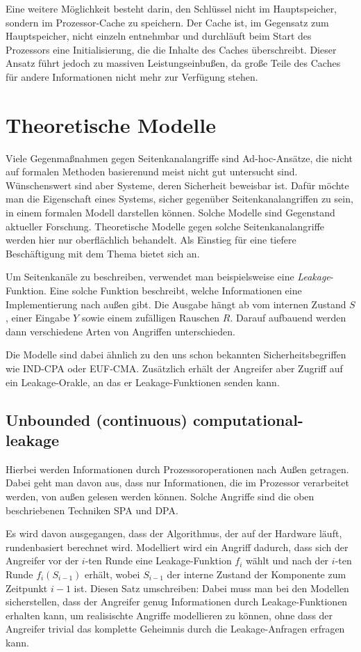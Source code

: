 Eine weitere Möglichkeit besteht darin, den Schlüssel nicht im
Hauptspeicher, sondern im Prozessor-Cache zu speichern. Der Cache ist,
im Gegensatz zum Hauptspeicher, nicht einzeln entnehmbar und durchläuft
beim Start des Prozessors eine Initialisierung, die die Inhalte des
Caches überschreibt. Dieser Ansatz führt jedoch zu massiven
Leistungseinbußen, da große Teile des Caches für andere Informationen
nicht mehr zur Verfügung stehen.
\section{Theoretische Modelle}
Viele Gegenmaßnahmen gegen Seitenkanalangriffe sind \glqq
Ad-hoc\grqq-Ansätze, die nicht auf formalen Methoden
basierenund meist nicht gut untersucht sind. Wünschenswert sind aber Systeme, deren Sicherheit beweisbar
ist. Dafür möchte man die Eigenschaft eines Systems, sicher gegenüber
Seitenkanalangriffen zu sein, in einem formalen Modell darstellen
können. Solche Modelle sind Gegenstand aktueller Forschung. Theoretische
Modelle gegen solche Seitenkanalangriffe werden hier nur oberflächlich
behandelt. Als Einstieg für eine tiefere Beschäftigung mit dem Thema
bietet sich \cite{mol2010} an.

Um Seitenkanäle zu beschreiben, verwendet man beispielsweise eine
\emph{Leakage}-Funktion. Eine solche Funktion beschreibt, welche
Informationen eine Implementierung nach außen gibt. Die Ausgabe hängt ab
vom internen Zustand $S$, einer Eingabe $Y$ sowie einem zufälligen
Rauschen $R$. Darauf aufbauend werden dann verschiedene Arten von
Angriffen unterschieden. 

Die Modelle sind dabei ähnlich zu den uns schon bekannten
Sicherheitsbegriffen wie IND-CPA oder EUF-CMA. Zusätzlich erhält der
Angreifer aber Zugriff auf ein Leakage-Orakle, an das er
Leakage-Funktionen senden kann. 
\subsection{Unbounded (continuous) computational-leakage}
Hierbei werden Informationen durch Prozessoroperationen nach Außen
getragen. Dabei geht man davon aus, dass nur Informationen, die im
Prozessor verarbeitet werden, von außen gelesen werden können. Solche
Angriffe sind die oben beschriebenen Techniken SPA und DPA.

Es wird davon ausgegangen, dass der Algorithmus, der auf der Hardware
läuft, rundenbasiert berechnet wird. Modelliert wird ein Angriff
dadurch, dass sich der Angreifer vor der $i$-ten Runde eine
Leakage-Funktion $f_i$ wählt und nach der $i$-ten Runde $f_i(S_{i-1})$
erhält, wobei $S_{i-1}$ der interne Zustand der Komponente zum
Zeitpunkt $i-1$ ist. Diesen Satz umschreiben: Dabei muss man bei den
Modellen sicherstellen, dass der Angreifer genug Informationen durch
Leakage-Funktionen erhalten kann, um realisischte Angriffe modellieren
zu können, ohne dass der Angreifer trivial das komplette Geheimnis durch
die Leakage-Anfragen erfragen kann. 

